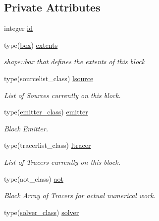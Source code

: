 \subsection*{Private Attributes}
\begin{DoxyCompactItemize}
\item 
integer \mbox{\hyperlink{structblocks__mod_1_1block__class_addd1a493d56aa1ffd1bc27c56b682065}{id}}
\item 
type(\mbox{\hyperlink{structgeometry__mod_1_1box}{box}}) \mbox{\hyperlink{structblocks__mod_1_1block__class_aff3b0cb7d8248f8a87691a028de916d3}{extents}}
\begin{DoxyCompactList}\small\item\em shape\+::box that defines the extents of this block \end{DoxyCompactList}\item 
type(sourcelist\+\_\+class) \mbox{\hyperlink{structblocks__mod_1_1block__class_a2f4d63afb2696e2728f20a99e26a4b18}{lsource}}
\begin{DoxyCompactList}\small\item\em List of Sources currently on this block. \end{DoxyCompactList}\item 
type(\mbox{\hyperlink{structemitter__mod_1_1emitter__class}{emitter\+\_\+class}}) \mbox{\hyperlink{structblocks__mod_1_1block__class_a55e85183ba871abcaba1c00d5393611f}{emitter}}
\begin{DoxyCompactList}\small\item\em Block Emitter. \end{DoxyCompactList}\item 
type(tracerlist\+\_\+class) \mbox{\hyperlink{structblocks__mod_1_1block__class_ab4e2108886a09ba919d01474503f6165}{ltracer}}
\begin{DoxyCompactList}\small\item\em List of Tracers currently on this block. \end{DoxyCompactList}\item 
type(aot\+\_\+class) \mbox{\hyperlink{structblocks__mod_1_1block__class_a53f912fe57eb5e386ca62b1dbd087417}{aot}}
\begin{DoxyCompactList}\small\item\em Block Array of Tracers for actual numerical work. \end{DoxyCompactList}\item 
type(\mbox{\hyperlink{structsolver__mod_1_1solver__class}{solver\+\_\+class}}) \mbox{\hyperlink{structblocks__mod_1_1block__class_a081258113128b3bcdefdbeac4bc5d039}{solver}}

\end{DoxyCompactItemize}

